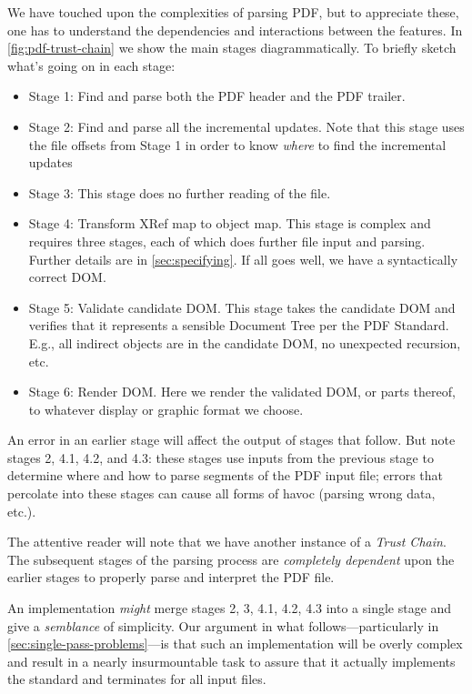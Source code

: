 We have touched upon the complexities of parsing
PDF, but to appreciate these, one has to understand the
dependencies and interactions between the features.
In \cref{fig:pdf-trust-chain} we show the main stages diagrammatically.
To briefly sketch what's going on in each stage:
\begin{itemize}
\item Stage 1: Find and parse both the PDF header and the PDF trailer.
\item Stage 2: Find and parse all the incremental updates.  Note that this stage
  uses the file offsets from Stage 1 in order to know \emph{where} to find the
  incremental updates
\item Stage 3: This stage does no further reading of the file.
\item Stage 4: Transform XRef map to object map. This stage is complex and
  requires three stages, each of which does further file input and parsing.
  Further details are in \cref{sec:specifying}.
  If all goes well, we have a syntactically correct DOM.
\item Stage 5: Validate candidate DOM.  This stage takes the candidate DOM and
  verifies that it represents a sensible Document Tree per the PDF Standard.
  E.g., all indirect objects are in the candidate DOM, no unexpected recursion,
  etc.
\item Stage 6: Render DOM.  Here we render the validated DOM, or parts thereof,
  to whatever display or graphic format we choose.
\end{itemize}

An error in an earlier stage will affect the output of stages that follow.
But note stages 2, 4.1, 4.2, and 4.3:
these stages use inputs from the previous stage to determine where and
how to parse segments of the PDF input file;
errors that percolate into these stages can
cause all forms of havoc (parsing wrong data, etc.).

The attentive reader will note that we have another instance of a \emph{Trust
Chain}.  The subsequent stages of the parsing process are \emph{completely
dependent} upon the earlier stages to properly parse and interpret the PDF
file.

An implementation \emph{might} merge stages 2, 3, 4.1, 4.2, 4.3 into
a single stage and give a \emph{semblance} of simplicity.
%
Our argument in what follows---particularly in
\cref{sec:single-pass-problems}---is
that such an implementation will be overly
complex and result in a nearly insurmountable task to assure that it
actually implements the standard and terminates for all input files.

